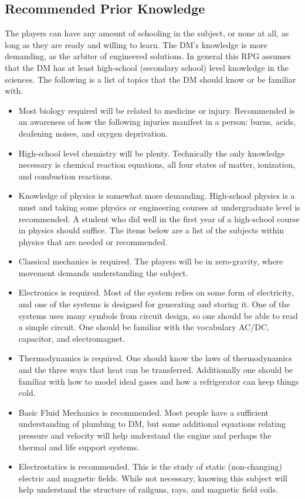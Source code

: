 \documentclass[a4paper]{article}
\begin{document}

\subsection{Recommended Prior Knowledge}

The players can have any amount of schooling in the subject, or none at all, as long as they are ready and willing to learn. The DM's knowledge is more demanding, as the arbiter of engineered solutions. In general this RPG assumes that the DM has at least high-school (secondary school) level knowledge in the sciences. The following is a list of topics that the DM should know or be familiar with.
\begin{itemize}
\item Most biology required will be related to medicine or injury. Recommended is an awareness of how the following injuries manifest in a person: burns, acids, deafening noises, and oxygen deprivation.
\item High-school level chemistry will be plenty. Technically the only knowledge necessary is chemical reaction equations, all four states of matter, ionization, and combustion reactions.
\item Knowledge of physics is somewhat more demanding. High-school physics is a must and taking some physics or engineering courses at undergraduate level is recommended. A student who did well in the first year of a high-school course in physics should suffice. The items below are a list of the subjects within physics that are needed or recommended. 
\item Classical mechanics is required. The players will be in zero-gravity, where movement demands understanding the subject.
\item Electronics is required. Most of the system relies on some form of electricity, and one of the systems is designed for generating and storing it. One of the systems uses many symbols from circuit design, so one should be able to read a simple circuit. One should be familiar with the vocabulary AC/DC, capacitor, and electromagnet.
\item Thermodynamics is required. One should know the laws of thermodynamics and the three ways that heat can be transferred. Additionally one should be familiar with how to model ideal gases and how a refrigerator can keep things cold.
\item Basic Fluid Mechanics is recommended. Most people have a sufficient understanding of plumbing to DM, but some additional equations relating pressure and velocity will help understand the engine and perhaps the thermal and life support systems.
\item Electrostatics is recommended. This is the study of static (non-changing) electric and magnetic fields. While not necessary, knowing this subject will help understand the structure of railguns, rays, and magnetic field coils.
\end{itemize}
\end{document}
